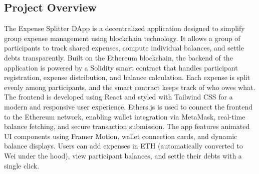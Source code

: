 \documentclass[12pt, a4paper]{article}
\begin{document}
\subsection{Project Overview}
The Expense Splitter DApp is a decentralized application designed to simplify group expense management using blockchain technology. It allows a group of participants to track shared expenses, compute individual balances, and settle debts transparently. Built on the Ethereum blockchain, the backend of the application is powered by a Solidity smart contract that handles participant registration, expense distribution, and balance calculation. Each expense is split evenly among participants, and the smart contract keeps track of who owes what.
\newline
The frontend is developed using React and styled with Tailwind CSS for a modern and responsive user experience. Ethers.js is used to connect the frontend to the Ethereum network, enabling wallet integration via MetaMask, real-time balance fetching, and secure transaction submission. The app features animated UI components using Framer Motion, wallet connection cards, and dynamic balance displays. Users can add expenses in ETH (automatically converted to Wei under the hood), view participant balances, and settle their debts with a single click.
\newpage
\end{document}
